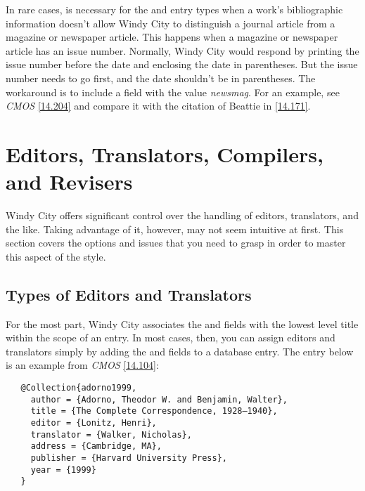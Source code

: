 \documentclass[11pt,letterpaper,oneside]{article}
\begin{document}
\begin{marglist}
In rare cases,  is necessary for the 
and  entry types when a work's bibliographic
information doesn't allow Windy City to distinguish a journal article
from a magazine or newspaper article. This happens when a magazine or
newspaper article has an issue number. Normally, Windy City would
respond by printing the issue number before the date and enclosing the
date in parentheses. But the issue number needs to go first, and the
date shouldn't be in parentheses. The workaround is to include a
 field with the value \textit{newsmag}. For an example,
see \textit{CMOS} \ref{14.204} and compare it with the citation of
Beattie in \ref{14.171}.

\end{marglist}

\section{Editors, Translators, Compilers, and Revisers}
\label{edtrans}

Windy City offers significant control over the handling of editors,
translators, and the like. Taking advantage of it, however, may not
seem intuitive at first. This section covers the options and issues
that you need to grasp in order to master this aspect of the style.

\subsection{Types of Editors and Translators}
\label{edtransnames}

For the most part, Windy City associates the  and
 fields with the lowest level title within the
scope of an entry. In most cases, then, you can assign editors and
translators simply by adding the  and
 fields to a database entry. The entry below is
an example from \textit{CMOS} \ref{14.104}:

\begin{verbatim}
   @Collection{adorno1999,
     author = {Adorno, Theodor W. and Benjamin, Walter},
     title = {The Complete Correspondence, 1928–1940},
     editor = {Lonitz, Henri},
     translator = {Walker, Nicholas},
     address = {Cambridge, MA},
     publisher = {Harvard University Press},
     year = {1999}
   }
\end{verbatim}

\begin{citebib}
\item \cite{adorno1999}
\end{citebib}
\end{document}

